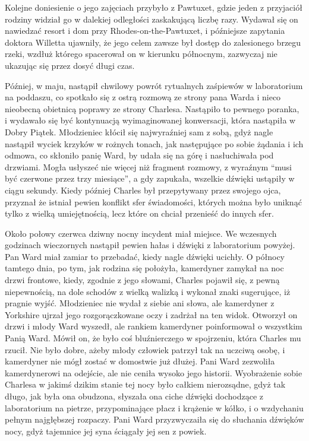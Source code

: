 Kolejne doniesienie o jego zajęciach przybyło z Pawtuxet, gdzie jeden z przyjaciół rodziny widział go w dalekiej odległości zaskakującą liczbę razy. Wydawał się on nawiedzać resort i dom przy Rhodes-on-the-Pawtuxet, i późniejsze zapytania doktora Willetta ujawniły, że jego celem zawsze był dostęp do zalesionego brzegu rzeki, wzdłuż którego spacerował on w kierunku północnym, zazwyczaj nie ukazując się przez dosyć długi czas. 

Później, w maju, nastąpił chwilowy powrót rytualnych zaśpiewów w laboratorium na poddaszu, co spotkało się z ostrą rozmową ze strony pana Warda i nieco nieobecną obietnicą poprawy ze strony Charlesa. Nastąpiło to pewnego poranka, i wydawało się być kontynuacją wyimaginowanej konwersacji, która nastąpiła w Dobry Piątek. Młodzieniec kłócił się najwyraźniej sam z sobą, gdyż nagle nastąpił wyciek krzyków w rożnych tonach, jak następujące po sobie żądania i ich odmowa, co skłoniło panię Ward, by udała się na górę i nasłuchiwała pod drzwiami. Mogła usłyszeć nie więcej niż fragment rozmowy, z wyraźnym ``musi być czerwone przez trzy miesiące'', a gdy zapukała, wszelkie dźwięki ustąpiły w ciągu sekundy. Kiedy później Charles był przepytywany przez swojego ojca, przyznał że istniał pewien konflikt sfer świadomości, których można było uniknąć tylko z wielką umiejętnością, lecz które on chciał przenieść do innych sfer. 

Około połowy czerwca dziwny nocny incydent miał miejsce. We wczesnych godzinach wieczornych nastąpił pewien hałas i dźwięki z laboratorium powyżej. Pan Ward miał zamiar to przebadać, kiedy nagle dźwięki ucichły. O północy tamtego dnia, po tym, jak rodzina się położyła, kamerdyner zamykał na noc drzwi frontowe, kiedy, zgodnie z jego słowami, Charles pojawił się, z pewną niepewnością, na dole schodów z wielką walizką  i wykonał znaki sugerujące, iż pragnie wyjść. Młodzieniec nie wydał z siebie ani słowa, ale kamerdyner z Yorkshire ujrzał jego rozgorączkowane oczy i zadrżał na ten widok. Otworzył on drzwi i młody Ward wyszedł, ale rankiem kamerdyner poinformował o wszystkim Panią Ward. Mówił on, że było coś bluźnierczego w spojrzeniu, która Charles mu rzucił. Nie było dobre, ażeby młody człowiek patrzył tak na uczciwą osobę, i kamerdyner nie mógł zostać w domostwie już dłużej. Pani Ward zezwoliła kamerdynerowi na odejście, ale nie ceniła wysoko jego historii. Wyobrażenie sobie Charlesa w jakimś dzikim stanie tej nocy było całkiem nierozsądne, gdyż tak długo, jak była ona obudzona, słyszała ona ciche dźwięki dochodzące z laboratorium na pietrze, przypominające płacz i krążenie w kółko, i o wzdychaniu pełnym najgłębszej rozpaczy. Pani Ward przyzwyczaiła się do słuchania dźwięków nocy, gdyż tajemnice jej syna ściągały jej sen z powiek. 

